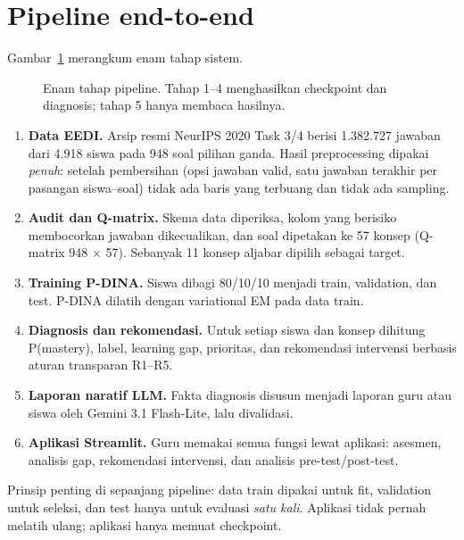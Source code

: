 \documentclass[11pt,a4paper]{article}
\begin{document}
\section{Pipeline end-to-end}

Gambar~\ref{fig:pipeline} merangkum enam tahap sistem.

\begin{figure}[h]
  \centering
  \resizebox{\linewidth}{!}{}
  \caption{Enam tahap pipeline. Tahap 1--4 menghasilkan checkpoint dan diagnosis; tahap 5 hanya membaca hasilnya.}
  \label{fig:pipeline}
\end{figure}

\begin{enumerate}
  \item \textbf{Data EEDI.} Arsip resmi NeurIPS 2020 Task 3/4 berisi 1.382.727 jawaban dari 4.918 siswa pada 948
        soal pilihan ganda. Hasil preprocessing dipakai \emph{penuh}: setelah pembersihan (opsi jawaban valid,
        satu jawaban terakhir per pasangan siswa--soal) tidak ada baris yang terbuang dan tidak ada sampling.
  \item \textbf{Audit dan Q-matrix.} Skema data diperiksa, kolom yang berisiko membocorkan jawaban dikecualikan, dan
        soal dipetakan ke 57 konsep (Q-matrix 948 $\times$ 57). Sebanyak 11 konsep aljabar dipilih sebagai target.
  \item \textbf{Training P-DINA.} Siswa dibagi 80/10/10 menjadi train, validation, dan test. P-DINA dilatih dengan
        variational EM pada data train.
  \item \textbf{Diagnosis dan rekomendasi.} Untuk setiap siswa dan konsep dihitung P(mastery), label, learning gap,
        prioritas, dan rekomendasi intervensi berbasis aturan transparan R1--R5.
  \item \textbf{Laporan naratif LLM.} Fakta diagnosis disusun menjadi laporan guru atau siswa oleh Gemini 3.1
        Flash-Lite, lalu divalidasi.
  \item \textbf{Aplikasi Streamlit.} Guru memakai semua fungsi lewat aplikasi: asesmen, analisis gap, rekomendasi
        intervensi, dan analisis pre-test/post-test.
\end{enumerate}

Prinsip penting di sepanjang pipeline: data train dipakai untuk fit, validation untuk seleksi, dan test hanya untuk
evaluasi \emph{satu kali}. Aplikasi tidak pernah melatih ulang; aplikasi hanya memuat checkpoint.

\end{document}
